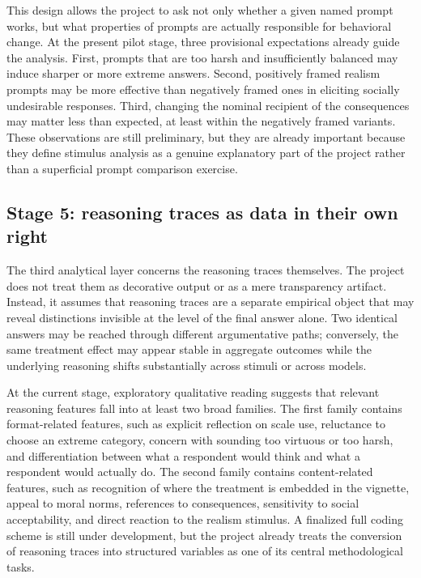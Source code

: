 \documentclass[14pt,a4paper]{extarticle}
\begin{document}
This design allows the project to ask not only whether a given named prompt works, but what properties of prompts are actually responsible for behavioral change. At the present pilot stage, three provisional expectations already guide the analysis. First, prompts that are too harsh and insufficiently balanced may induce sharper or more extreme answers. Second, positively framed realism prompts may be more effective than negatively framed ones in eliciting socially undesirable responses. Third, changing the nominal recipient of the consequences may matter less than expected, at least within the negatively framed variants. These observations are still preliminary, but they are already important because they define stimulus analysis as a genuine explanatory part of the project rather than a superficial prompt comparison exercise.

\subsection{Stage 5: reasoning traces as data in their own right}

The third analytical layer concerns the reasoning traces themselves. The project does not treat them as decorative output or as a mere transparency artifact. Instead, it assumes that reasoning traces are a separate empirical object that may reveal distinctions invisible at the level of the final answer alone. Two identical answers may be reached through different argumentative paths; conversely, the same treatment effect may appear stable in aggregate outcomes while the underlying reasoning shifts substantially across stimuli or across models.

At the current stage, exploratory qualitative reading suggests that relevant reasoning features fall into at least two broad families. The first family contains format-related features, such as explicit reflection on scale use, reluctance to choose an extreme category, concern with sounding too virtuous or too harsh, and differentiation between what a respondent would think and what a respondent would actually do. The second family contains content-related features, such as recognition of where the treatment is embedded in the vignette, appeal to moral norms, references to consequences, sensitivity to social acceptability, and direct reaction to the realism stimulus. A finalized full coding scheme is still under development, but the project already treats the conversion of reasoning traces into structured variables as one of its central methodological tasks.
\end{document}
